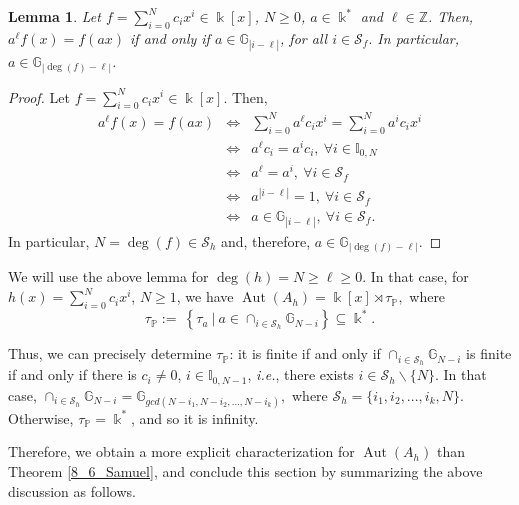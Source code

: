 \documentclass{article}
\numberwithin{equation}{section}\theoremstyle{plain}
\newtheorem{lemma}[theorem]{Lemma}
\newcommand\I{\mathbb I}
\DeclareMathOperator{\Aut}{Aut}
\begin{document}
\begin{lemma}\label{lemma_raizdaunidade}
Let $f=\sum_{i=0}^{N}c_ix^i\in \Bbbk[x]$, $N\geq 0$, $a\in \Bbbk^\ast$ and $\ell\in\mathbb{Z}$.
Then, $a^\ell f(x) = f(ax)$  if and only if $a\in \mathbb{G}_{|i-\ell|}$, for all $i \in \mathcal{S}_f.$
In particular, $a \in \mathbb{G}_{|\deg(f)-\ell|}$.
\end{lemma}
\begin{proof}
    Let $f=\sum_{i=0}^{N}c_ix^i \in \Bbbk[x]$.
    Then, \begin{eqnarray*}
        a^\ell f(x) = f(ax) & \Longleftrightarrow & \sum_{i=0}^{N}a^{\ell}c_ix^i= \sum_{i=0}^{N}a^ic_ix^i\\
        & \Longleftrightarrow & a^{\ell}c_i= a^ic_i, \ \forall i \in \I_{0,N}\\
        & \Longleftrightarrow & a^{\ell}=a^i, \ \forall i \in \mathcal{S}_f \\
        & \Longleftrightarrow & a^{|i-\ell|}=1, \ \forall i \in \mathcal{S}_f \\
        & \Longleftrightarrow & a\in \mathbb{G}_{|i-\ell|}, \ \forall i \in \mathcal{S}_f.
    \end{eqnarray*}
    In particular, $N=\deg(f) \in \mathcal{S}_h$ and, therefore, $a \in \mathbb{G}_{|\deg(f)-\ell|}$.
\end{proof}

We will use the above lemma for $\deg(h)=N \geq \ell \geq 0$.
In that case, for $h(x)=\sum\limits_{i=0}^{N}c_ix^i $, $N\geq 1$, we have $\Aut(A_h)=\Bbbk[x]\rtimes \tau_{\mathbb{P}},$ where 
\begin{equation}\label{tau_P}
\tau_{\mathbb{P}}:=\ \left\{\tau_{a} \ | \ a\in \cap_{i \in \mathcal{S}_h}\mathbb{G}_{N-i}\right\} \subseteq \Bbbk^{\ast}.
\end{equation}

Thus, we can precisely determine $\tau_{\mathbb{P}}$: it is finite if and only if $\cap_{i \in \mathcal{S}_h}\mathbb{G}_{N-i}$ is finite if and only if there is $c_i\neq 0$, $i\in \I_{0,N-1}$, \emph{i.e.}, there exists $i \in \mathcal{S}_h \backslash \{N\}$.
In that case, $\cap_{i \in \mathcal{S}_h}\mathbb{G}_{N-i}=\mathbb{G}_{gcd(N-i_1, N-i_2, ..., N-i_k)},$ where $\mathcal{S}_h = \{ i_1, i_2, ..., i_k, N \}.$
Otherwise, $\tau_{\mathbb{P}} = \Bbbk^\ast$, and so it is infinity. 

\medbreak

Therefore, we obtain a more explicit characterization for $\Aut(A_h)$ than Theorem \ref{8_6_Samuel}, and conclude this section by summarizing the above discussion as follows.
\end{document}
